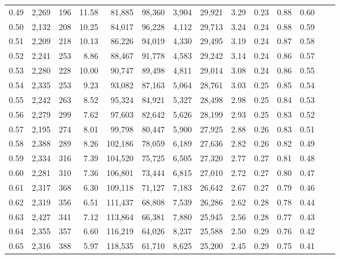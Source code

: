 \begin{tabular}{rrrrrrrrrrrrrr}
0.49 &  2,269 &    196 &   11.58 &   81,885 &   98,360 &   3,904 &  29,921 &  3.29 &  0.23 &  0.88 &      0.60 \\
0.50 &  2,132 &    208 &   10.25 &   84,017 &   96,228 &   4,112 &  29,713 &  3.24 &  0.24 &  0.88 &      0.59 \\
0.51 &  2,209 &    218 &   10.13 &   86,226 &   94,019 &   4,330 &  29,495 &  3.19 &  0.24 &  0.87 &      0.58 \\
0.52 &  2,241 &    253 &    8.86 &   88,467 &   91,778 &   4,583 &  29,242 &  3.14 &  0.24 &  0.86 &      0.57 \\
0.53 &  2,280 &    228 &   10.00 &   90,747 &   89,498 &   4,811 &  29,014 &  3.08 &  0.24 &  0.86 &      0.55 \\
0.54 &  2,335 &    253 &    9.23 &   93,082 &   87,163 &   5,064 &  28,761 &  3.03 &  0.25 &  0.85 &      0.54 \\
0.55 &  2,242 &    263 &    8.52 &   95,324 &   84,921 &   5,327 &  28,498 &  2.98 &  0.25 &  0.84 &      0.53 \\
0.56 &  2,279 &    299 &    7.62 &   97,603 &   82,642 &   5,626 &  28,199 &  2.93 &  0.25 &  0.83 &      0.52 \\
0.57 &  2,195 &    274 &    8.01 &   99,798 &   80,447 &   5,900 &  27,925 &  2.88 &  0.26 &  0.83 &      0.51 \\
0.58 &  2,388 &    289 &    8.26 &  102,186 &   78,059 &   6,189 &  27,636 &  2.82 &  0.26 &  0.82 &      0.49 \\
0.59 &  2,334 &    316 &    7.39 &  104,520 &   75,725 &   6,505 &  27,320 &  2.77 &  0.27 &  0.81 &      0.48 \\
0.60 &  2,281 &    310 &    7.36 &  106,801 &   73,444 &   6,815 &  27,010 &  2.72 &  0.27 &  0.80 &      0.47 \\
0.61 &  2,317 &    368 &    6.30 &  109,118 &   71,127 &   7,183 &  26,642 &  2.67 &  0.27 &  0.79 &      0.46 \\
0.62 &  2,319 &    356 &    6.51 &  111,437 &   68,808 &   7,539 &  26,286 &  2.62 &  0.28 &  0.78 &      0.44 \\
0.63 &  2,427 &    341 &    7.12 &  113,864 &   66,381 &   7,880 &  25,945 &  2.56 &  0.28 &  0.77 &      0.43 \\
0.64 &  2,355 &    357 &    6.60 &  116,219 &   64,026 &   8,237 &  25,588 &  2.50 &  0.29 &  0.76 &      0.42 \\
0.65 &  2,316 &    388 &    5.97 &  118,535 &   61,710 &   8,625 &  25,200 &  2.45 &  0.29 &  0.75 &      0.41 \\

\end{tabular}
